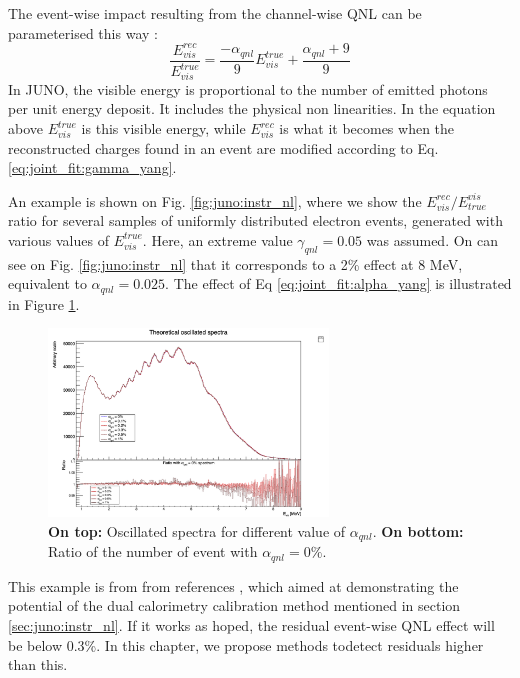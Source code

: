 \documentclass[../main.tex]{subfiles}
\begin{document}
The event-wise impact resulting from the channel-wise QNL can be parameterised this way :
\begin{equation}
  \label{eq:joint_fit:alpha_yang}
  \frac{E^{rec}_{vis}}{E^{true}_{vis}} = \frac{-\alpha_{qnl}}{9} E^{true}_{vis} + \frac{\alpha_{qnl} + 9}{9}
\end{equation}
In JUNO, the visible energy is proportional to the number of emitted photons per unit energy deposit. It includes the physical non linearities.
In the equation above $E_{vis}^{true}$ is this visible energy, while $E_{vis}^{rec}$ is what it becomes when the reconstructed charges found in an event are modified according to Eq. \ref{eq:joint_fit:gamma_yang}.

An example is shown on Fig. \ref{fig:juno:instr_nl}, where we show the $E^{rec}_{vis}/E_{true}^{vis}$ ratio for several samples of uniformly distributed electron events, generated with various values of $E_{vis}^{true}$.
Here, an extreme value $\gamma_{qnl}=0.05$ was assumed. On can see on Fig. \ref{fig:juno:instr_nl} that it corresponds to a 2\% effect at 8 MeV, equivalent to $\alpha_{qnl} = 0.025$. The effect of Eq \ref{eq:joint_fit:alpha_yang} is illustrated in Figure \ref{fig:joint_fit:spectrums_comp}.

\begin{figure}[ht]
  \centering
  \includegraphics[height=5cm]{images/joint_fit/spectrums.png}
  \caption{\textbf{On top:} Oscillated spectra for different value of $\alpha_{qnl}$. \textbf{On bottom:} Ratio of the number of event with $\alpha_{qnl} = 0\%$.}
  \label{fig:joint_fit:spectrums_comp}
\end{figure}

This example is from  from references \cite{han_dual_2021}, which aimed at demonstrating the potential of the dual calorimetry calibration method mentioned in section
\ref{sec:juno:instr_nl}. If it works as hoped, the residual event-wise QNL effect will be below 0.3\%. In this chapter, we propose methods todetect residuals higher than this.
\end{document}
